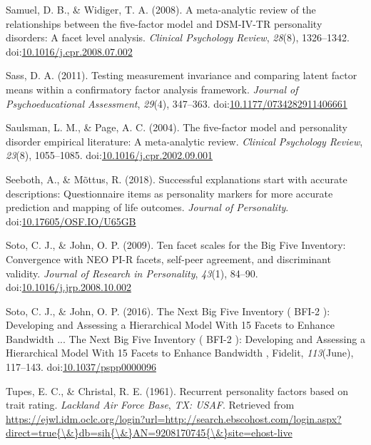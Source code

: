 \documentclass[man]{apa6}
\theoremstyle{definition}
\theoremstyle{definition}
\theoremstyle{definition}
\theoremstyle{remark}
\begin{document}
\leavevmode\hypertarget{ref-SamuelWidiger2008}{}%
Samuel, D. B., \& Widiger, T. A. (2008). A meta-analytic review of the
relationships between the five-factor model and DSM-IV-TR personality
disorders: A facet level analysis. \emph{Clinical Psychology Review},
\emph{28}(8), 1326--1342.
doi:\href{https://doi.org/10.1016/j.cpr.2008.07.002}{10.1016/j.cpr.2008.07.002}

\leavevmode\hypertarget{ref-Sass2011}{}%
Sass, D. A. (2011). Testing measurement invariance and comparing latent
factor means within a confirmatory factor analysis framework.
\emph{Journal of Psychoeducational Assessment}, \emph{29}(4), 347--363.
doi:\href{https://doi.org/10.1177/0734282911406661}{10.1177/0734282911406661}

\leavevmode\hypertarget{ref-SaulsmanPage2004}{}%
Saulsman, L. M., \& Page, A. C. (2004). The five-factor model and
personality disorder empirical literature: A meta-analytic review.
\emph{Clinical Psychology Review}, \emph{23}(8), 1055--1085.
doi:\href{https://doi.org/10.1016/j.cpr.2002.09.001}{10.1016/j.cpr.2002.09.001}

\leavevmode\hypertarget{ref-Seeboth2018}{}%
Seeboth, A., \& Mõttus, R. (2018). Successful explanations start with
accurate descriptions: Questionnaire items as personality markers for
more accurate prediction and mapping of life outcomes. \emph{Journal of
Personality}.
doi:\href{https://doi.org/10.17605/OSF.IO/U65GB}{10.17605/OSF.IO/U65GB}

\leavevmode\hypertarget{ref-SotoJohn2009}{}%
Soto, C. J., \& John, O. P. (2009). Ten facet scales for the Big Five
Inventory: Convergence with NEO PI-R facets, self-peer agreement, and
discriminant validity. \emph{Journal of Research in Personality},
\emph{43}(1), 84--90.
doi:\href{https://doi.org/10.1016/j.jrp.2008.10.002}{10.1016/j.jrp.2008.10.002}

\leavevmode\hypertarget{ref-SotoJohn2016}{}%
Soto, C. J., \& John, O. P. (2016). The Next Big Five Inventory ( BFI-2
): Developing and Assessing a Hierarchical Model With 15 Facets to
Enhance Bandwidth ... The Next Big Five Inventory ( BFI-2 ): Developing
and Assessing a Hierarchical Model With 15 Facets to Enhance Bandwidth ,
Fidelit, \emph{113}(June), 117--143.
doi:\href{https://doi.org/10.1037/pspp0000096}{10.1037/pspp0000096}

\leavevmode\hypertarget{ref-TupesChristal1961}{}%
Tupes, E. C., \& Christal, R. E. (1961). Recurrent personality factors
based on trait rating. \emph{Lackland Air Force Base}, \emph{TX: USAF}.
Retrieved from
\href{https://ejwl.idm.oclc.org/login?url=http://search.ebscohost.com/login.aspx?direct=true\%7B/\&\%7Ddb=sih\%7B/\&\%7DAN=9208170745\%7B/\&\%7Dsite=ehost-live}{https://ejwl.idm.oclc.org/login?url=http://search.ebscohost.com/login.aspx?direct=true\{\textbackslash{}\&\}db=sih\{\textbackslash{}\&\}AN=9208170745\{\textbackslash{}\&\}site=ehost-live}
\end{document}
